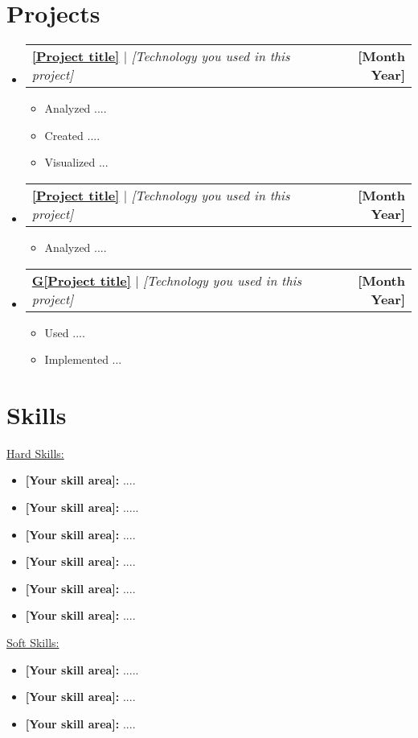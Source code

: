 \documentclass[letterpaper,11pt]{article}
\makeatletter
\newcommand{\resumeItem}[1]{
  \item\small{
    {#1 \vspace{-2pt}}
  }
}
\newcommand{\resumeProjectHeading}[2]{
    \item
    \begin{tabular*}{1.001\textwidth}{l@{\extracolsep{\fill}}r}
      \small#1 & \textbf{\small #2}\\
    \end{tabular*}\vspace{-7pt}
}
\newcommand{\resumeSubHeadingListStart}{\begin{itemize}[leftmargin=0.0in, label={}]}
\newcommand{\resumeSubHeadingListEnd}{\end{itemize}}
\newcommand{\resumeItemListStart}{\begin{itemize}}
\newcommand{\resumeItemListEnd}{\end{itemize}\vspace{-5pt}}
\makeatother
\begin{document}
\section{Projects}
    \vspace{-5pt}
    \resumeSubHeadingListStart
      \resumeProjectHeading
          {\href{[Github link, about your project]}{\textbf{[Project title]}} $|$ \emph{[Technology you used in this project]}}{[Month Year]}
          \resumeItemListStart
            \resumeItem{Analyzed ....}
            \resumeItem{Created ....}
            \resumeItem{Visualized ...}
          \resumeItemListEnd
          \vspace{-13pt}
      \resumeProjectHeading
          {\href{[Github link, about your project]}{\textbf{[Project title]}} $|$ \emph{[Technology you used in this project]}}{[Month Year]}
          \resumeItemListStart
            \resumeItem{Analyzed ....}
          \resumeItemListEnd 
          \vspace{-13pt}
          \resumeProjectHeading
          {\href{[Github link, about your project]}{\textbf{G[Project title]}} $|$ \emph{[Technology you used in this project]}}{[Month Year]}
          \resumeItemListStart
            \resumeItem{Used ....}
            \resumeItem{Implemented ...}
          \resumeItemListEnd 
    \resumeSubHeadingListEnd
\vspace{-15pt}

\section{Skills}
 \begin{itemize}[leftmargin=0.01in, label={}]
    \small{\item{
     \underline{Hard Skills:}
        \resumeItemListStart
            \resumeItem{\textbf{[Your skill area]:} ....}
            \resumeItem{\textbf{[Your skill area]:} .....}
            \resumeItem{\textbf{[Your skill area]:} ....}
            \resumeItem{\textbf{[Your skill area]:} ....}
            \resumeItem{\textbf{[Your skill area]:} ....}
            \resumeItem{\textbf{[Your skill area]:} ....}
        \resumeItemListEnd
     \underline{{Soft Skills:}}
        \resumeItemListStart
            \resumeItem{\textbf{[Your skill area]:} .....}
            \resumeItem{\textbf{[Your skill area]:} ....}
            \resumeItem{\textbf{[Your skill area]:} ....}
        \resumeItemListEnd
    }}
 \end{itemize}
\vspace{-16pt}
\end{document}
